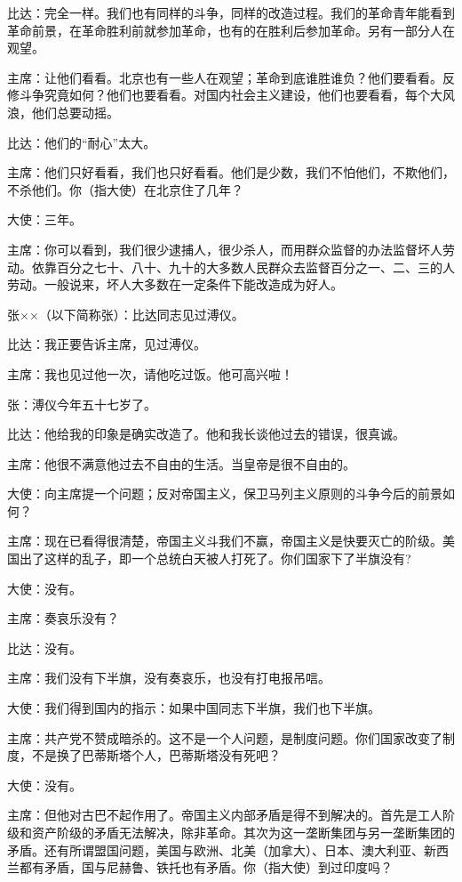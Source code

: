 比达：完全一样。我们也有同样的斗争，同样的改造过程。我们的革命青年能看到革命前景，在革命胜利前就参加革命，也有的在胜利后参加革命。另有一部分人在观望。

主席：让他们看看。北京也有一些人在观望；革命到底谁胜谁负？他们要看看。反修斗争究竟如何？他们也要看看。对国内社会主义建设，他们也要看看，每个大风浪，他们总要动摇。

比达：他们的“耐心”太大。

主席：他们只好看看，我们也只好看看。他们是少数，我们不怕他们，不欺他们，不杀他们。你（指大使）在北京住了几年？

大使：三年。

主席：你可以看到，我们很少逮捕人，很少杀人，而用群众监督的办法监督坏人劳动。依靠百分之七十、八十、九十的大多数人民群众去监督百分之一、二、三的人劳动。一般说来，坏人大多数在一定条件下能改造成为好人。

张××（以下简称张）：比达同志见过溥仪。

比达：我正要告诉主席，见过溥仪。

主席：我也见过他一次，请他吃过饭。他可高兴啦！

张：溥仪今年五十七岁了。

比达：他给我的印象是确实改造了。他和我长谈他过去的错误，很真诚。

主席：他很不满意他过去不自由的生活。当皇帝是很不自由的。

大使：向主席提一个问题；反对帝国主义，保卫马列主义原则的斗争今后的前景如何？

主席：现在已看得很清楚，帝国主义斗我们不赢，帝国主义是快要灭亡的阶级。美国出了这样的乱子，即一个总统白天被人打死了。你们国家下了半旗没有?

大使：没有。

主席：奏哀乐没有？

比达：没有。

主席：我们没有下半旗，没有奏哀乐，也没有打电报吊唁。

大使：我们得到国内的指示：如果中国同志下半旗，我们也下半旗。

主席：共产党不赞成暗杀的。这不是一个人问题，是制度问题。你们国家改变了制度，不是换了巴蒂斯塔个人，巴蒂斯塔没有死吧？

大使：没有。

主席：但他对古巴不起作用了。帝国主义内部矛盾是得不到解决的。首先是工人阶级和资产阶级的矛盾无法解决，除非革命。其次为这一垄断集团与另一垄断集团的矛盾。还有所谓盟国问题，美国与欧洲、北美（加拿大）、日本、澳大利亚、新西兰都有矛盾，国与尼赫鲁、铁托也有矛盾。你（指大使）到过印度吗？

